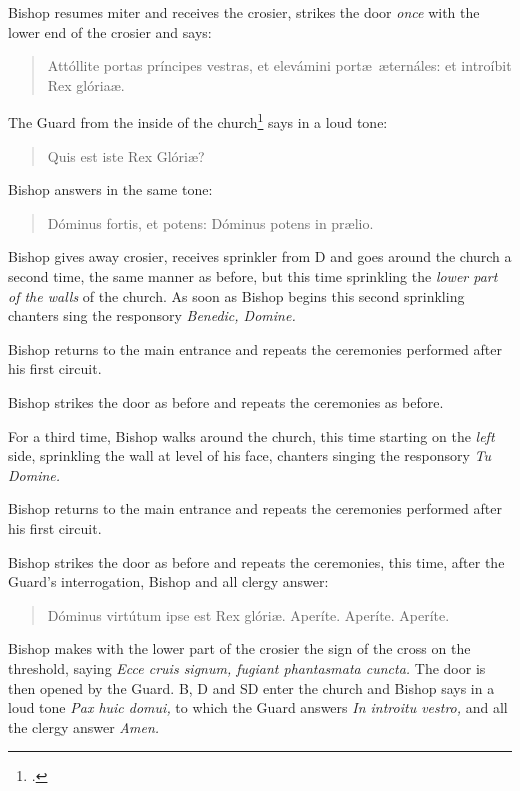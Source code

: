 \documentclass[letterpaper]{report}
\begin{document}
{\rubric Bishop resumes miter and receives the crosier, strikes the door
\textit{once} with the lower end of the crosier and says:

\begin{quote}
    Attóllite portas príncipes vestras, et elevámini port\ae\ \ae ternáles: et
    introíbit Rex glória\ae.
\end{quote}

The Guard from the inside of the church\footcite[The door may be slightly open,
so that the bishop and deacon can hear each other.][note 1, p.
46.]{consecranda} says in a loud tone:

\begin{quote}
   Quis est iste Rex Glóri\ae? 
\end{quote}

Bishop answers in the same tone:

\begin{quote}
    Dóminus fortis, et potens: Dóminus potens in pr\ae lio.
\end{quote}

\rubric Bishop gives away crosier, receives sprinkler from D and goes around the
church a second time, the same manner as before, but this time sprinkling the
\textit{lower part of the walls} of the church. As soon as Bishop begins this second
sprinkling chanters sing the responsory \textit{Benedic, Domine.}

\rubric Bishop returns to the main entrance and repeats the ceremonies performed
after his first circuit.

\rubric Bishop strikes the door as before and repeats the ceremonies as before.

\rubric For a third time, Bishop walks around the church, this time starting on the
\textit{left} side, sprinkling the wall at level of his face, chanters singing
the responsory \textit{Tu Domine.}

\rubric Bishop returns to the main entrance and repeats the ceremonies performed
after his first circuit.

\rubric Bishop strikes the door as before and repeats the ceremonies, this
time, after the Guard's interrogation, Bishop and all clergy answer:

\begin{quote}
    Dóminus virtútum ipse est Rex glóri\ae. Aperíte. Aperíte. Aperíte.
\end{quote}

\rubric Bishop makes with the lower part of the crosier the sign of the cross on the
threshold, saying \textit{Ecce cru\cross is signum, fugiant phantasmata
cuncta.} The door is then opened by the Guard. B, D and SD enter the church and
Bishop says in a loud tone \textit{Pax huic domui,} to which the Guard answers
\textit{In introitu vestro,} and all the clergy answer \textit{Amen.}

}
\end{document}
